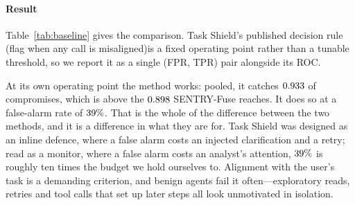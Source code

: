 \documentclass[pdflatex,sn-basic]{sn-jnl}%
\theoremstyle{thmstyleone}
\theoremstyle{thmstyletwo}
\theoremstyle{thmstylethree}
\begin{document}
\paragraph{Result} Table~\ref{tab:baseline} gives the comparison. Task Shield's
published decision rule (flag when any call is misaligned)is a fixed operating
point rather than a tunable threshold, so we report it as a single (FPR, TPR) pair
alongside its ROC.

At its own operating point the method works: pooled, it catches $0.933$ of
compromises, which is above the $0.898$ SENTRY-Fuse reaches. It does so at a
false-alarm rate of $39\%$. That is the whole of the difference
between the two methods, and it is a difference in what they are for. Task Shield
was designed as an inline defence, where a false alarm costs an injected
clarification and a retry; read as a monitor, where a false alarm costs an analyst's
attention, $39\%$ is roughly ten times the budget we hold ourselves
to. Alignment with the user's task is a demanding criterion, and benign agents fail
it often---exploratory reads, retries and tool calls that set up later steps all
look unmotivated in isolation.
\end{document}
